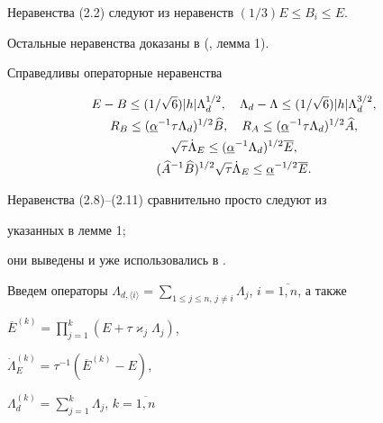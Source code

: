 Неравенства (2.2) следуют из неравенств $(1/3)E\le B_i\le E$.


Остальные неравенства доказаны в (\cite{Za}, лемма 1).





\begin{cor} Справедливы операторные неравенства


\begin{gather}


E-B\le(1/\sqrt 6)\vert h\vert \Lambda_d^{1/2},\quad


 \Lambda_d-\Lambda\le(1/\sqrt 6)\vert h\vert\Lambda_d^{3/2},\\


%


R_B\le ({\underline\alpha}^{-1}\tau\Lambda_d)^{1/2}\bbb,\quad


 R_A\le ({\underline \alpha}^{-1}\tau\Lambda_d)^{1/2}\aaa,\\


%


\sqrt{\tau}\Dot\Lambda_E\le ({\underline\alpha}^{-1}\Lambda_d)^{1/2}


{\overline E},\\


%


(\aaa^{-1}\bbb)^{1/2}\sqrt{\tau}\Dot\Lambda_E\le\underline\alpha^{-1/2}


\overline E.


\end{gather}


\end{cor}





Неравенства (2.8)--(2.11) сравнительно просто следуют из 


указанных в лемме 1;


они выведены и уже использовались в \cite{Za}.





Введем операторы $\Lambda_{d,\langle i\rangle}=\sum_{1\le j\le n,\,j\ne i}


\Lambda_j$, $i=\overline{1,n}$, а также 


$\overline E^{(k)}=\prod_{j=1}^k(E+\tau\varkappa_j\Lambda_j)$, 


$\Dot\Lambda_E^{(k)}=\tau^{-1}(\overline E^{(k)}-E)$, 


$\Lambda_d^{(k)}=\sum_{j=1}^k\Lambda_j$, $k=\overline{1,n}$


